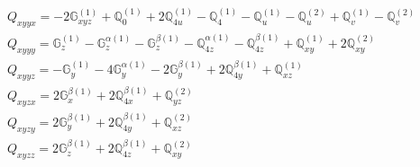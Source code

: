 \documentclass[fleqn,8pt,landscape]{jsarticle}
\begin{document}
\begin{align*}
& Q_{xyyx} = - 2 \mathbb{G}_{xyz}^{(1)} + \mathbb{Q}_{0}^{(1)} + 2 \mathbb{Q}_{4u}^{(1)} - \mathbb{Q}_{4}^{(1)} - \mathbb{Q}_{u}^{(1)} - \mathbb{Q}_{u}^{(2)} + \mathbb{Q}_{v}^{(1)} - \mathbb{Q}_{v}^{(2)} \\
& Q_{xyyy} = \mathbb{G}_{z}^{(1)} - \mathbb{G}_{z}^{\alpha(1)} - \mathbb{G}_{z}^{\beta(1)} - \mathbb{Q}_{4z}^{\alpha(1)} - \mathbb{Q}_{4z}^{\beta(1)} + \mathbb{Q}_{xy}^{(1)} + 2 \mathbb{Q}_{xy}^{(2)} \\
& Q_{xyyz} = - \mathbb{G}_{y}^{(1)} - 4 \mathbb{G}_{y}^{\alpha(1)} - 2 \mathbb{G}_{y}^{\beta(1)} + 2 \mathbb{Q}_{4y}^{\beta(1)} + \mathbb{Q}_{xz}^{(1)} \\
& Q_{xyzx} = 2 \mathbb{G}_{x}^{\beta(1)} + 2 \mathbb{Q}_{4x}^{\beta(1)} + \mathbb{Q}_{yz}^{(2)} \\
& Q_{xyzy} = 2 \mathbb{G}_{y}^{\beta(1)} + 2 \mathbb{Q}_{4y}^{\beta(1)} + \mathbb{Q}_{xz}^{(2)} \\
& Q_{xyzz} = 2 \mathbb{G}_{z}^{\beta(1)} + 2 \mathbb{Q}_{4z}^{\beta(1)} + \mathbb{Q}_{xy}^{(2)}
\end{align*}
\end{document}
